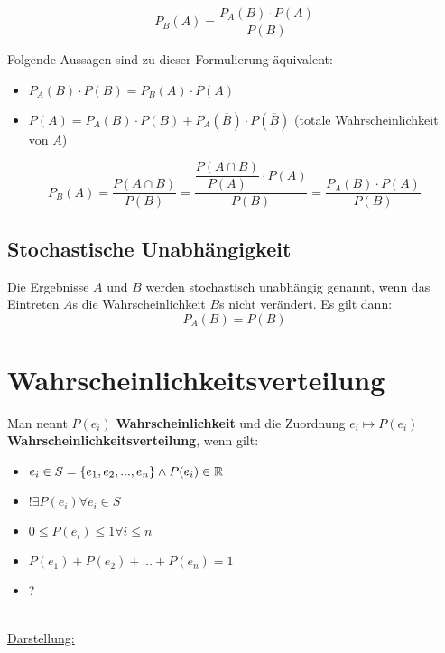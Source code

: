 \documentclass[../MAIN/main.tex]{subfiles}
\begin{document}
\begin{Theorem}
  $$P_B(A)=\dfrac{P_A(B)\cdot P(A)}{P(B)}$$
\end{Theorem}
\begin{Bemerkung}
  Folgende Aussagen sind zu dieser Formulierung äquivalent:
  \begin{itemize}
    \item $P_A(B)\cdot P(B) = P_B(A)\cdot P(A)$
    \item $P(A) = P_A(B) \cdot P(B) + P_A(\overline B) \cdot P(\overline B)$ (totale Wahrscheinlichkeit von $A$)
  \end{itemize}
\end{Bemerkung}
\begin{Beweis}
  $$P_B(A) = \dfrac{P(A\cap B)}{P(B)} = \dfrac{\dfrac{P(A\cap B)}{P(A)}\cdot P(A)}{P(B)} = \dfrac{P_A(B)\cdot P(A)}{P(B)}$$
\end{Beweis}
\subsection{Stochastische Unabhängigkeit}
\begin{Definition}
  Die Ergebnisse $A$ und $B$ werden stochastisch unabhängig genannt, wenn das Eintreten $A$s die Wahrscheinlichkeit $B$s nicht verändert. Es gilt dann:
  $$P_A(B)=P(B)$$
\end{Definition}



\section{Wahrscheinlichkeitsverteilung}
\begin{Definition}
  Man nennt $P(e_i)$ \textbf{Wahrscheinlichkeit} und die Zuordnung $e_i \longmapsto P(e_i)$ \textbf{Wahrscheinlichkeitsverteilung}, wenn gilt:
  \begin{itemize}
    \item $e_i \in S=\{ e_1,e_2,...,e_n\} \land P(e_i)\in \mathbb{R}$
    \item $!\exists P(e_i) \forall e_i \in S$
    \item $0 \leq P(e_i)\leq 1 \forall i \leq n$
    \item $P(e_1)+P(e_2)+...+P(e_n)=1$
    \item ?
  \end{itemize}
\end{Definition}\\
\underline{Darstellung:}\\
\end{document}
